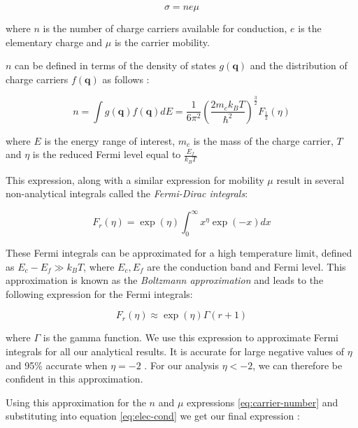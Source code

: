 \documentclass[12pt]{article}
\renewcommand{\vec}[1]{\mathbf{#1}}
\begin{document}
\begin{equation}
\label{eq:elec-cond}
	\sigma = n e \mu
\end{equation}

where $n$ is the number of charge carriers available for conduction, $e$ is the elementary charge and $\mu$ is the carrier mobility.

$n$ can be defined in terms of the density of states $g(\vec{q})$ and the distribution of charge carriers $f(\vec{q})$ as follows \cite{kittel}:

\begin{equation}
\label{eq:carrier-number}
	n = \int g(\vec{q}) f(\vec{q}) dE = \frac{1}{6\pi^2} \left(\frac{2m_c k_B T}{\hbar^2}\right)^\frac{3}{2} F_\frac{1}{2}(\eta)
\end{equation}

where $E$ is the energy range of interest, $m_c$ is the mass of the charge carrier, $T$ and $\eta$ is the reduced Fermi level equal to $\frac{E_f}{k_B T}$

This expression, along with a similar expression for mobility $\mu$ \cite{kittel} result in several non-analytical integrals called the \emph{Fermi-Dirac integrals}:

\begin{equation}
\label{eq:fermi-integral}
	F_r(\eta) = \exp(\eta) \int_0^\infty x^\eta \exp(-x) dx
\end{equation}

These Fermi integrals can be approximated for a high temperature limit, defined as $E_c - E_f \gg k_B T$, where $E_c, E_f$ are the conduction band and Fermi level. This approximation is known as the \emph{Boltzmann approximation} \cite{kittel} and leads to the following expression for the Fermi integrals:

\begin{equation}
\label{eq:fermi-integral-approx}
	F_r(\eta) \approx \exp(\eta)\Gamma(r+1)
\end{equation}

where $\Gamma$ is the gamma function. We use this expression to approximate Fermi integrals for all our analytical results. It is accurate for large negative values of $\eta$ and 95\% accurate when $\eta = -2$ \cite{drabble}. For our analysis $\eta < -2$, we can therefore be confident in this approximation.

Using this approximation for the $n$ and $\mu$ expressions \eqref{eq:carrier-number} and substituting into equation \eqref{eq:elec-cond} we get our final expression \cite{drabble}:
\end{document}
